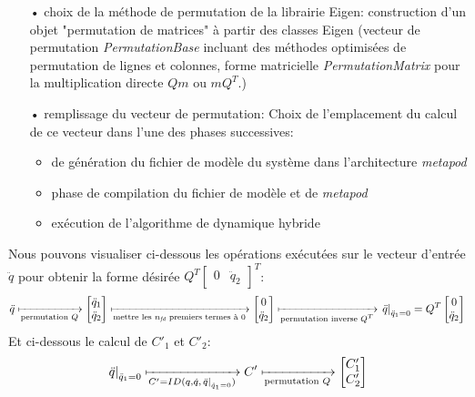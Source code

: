 \documentclass{report}
\begin{document}
\begin{itemize}
  \item[•] choix de la méthode de permutation de la librairie Eigen: construction d'un objet "permutation de matrices" à partir des classes Eigen (vecteur de permutation \emph{PermutationBase} incluant des méthodes optimisées de permutation de lignes et colonnes, forme matricielle \emph{PermutationMatrix} pour la multiplication directe $Qm$ ou $mQ^T$.)
  \item[•] remplissage du vecteur de permutation: Choix de l'emplacement du calcul de ce vecteur dans l'une des phases successives:
  \begin{itemize}
    \item de génération du fichier de modèle du système dans l'architecture \emph{metapod}
    \item phase de compilation du fichier de modèle et de \emph{metapod}
    \item exécution de l'algorithme de dynamique hybride
  \end{itemize}
\end{itemize}
\medskip
Nous pouvons visualiser ci-dessous les opérations exécutées sur le vecteur d'entrée $\ddot{q}$ pour obtenir la forme désirée \(Q^T \begin{bmatrix} 0 & \ddot{q}_2 \end{bmatrix}^T\):
\begin{equation*}
\ddot{q} \xmapsto[\textnormal{permutation $Q$}]{} 
\begin{bmatrix}
  \ddot{q}_1 \\
  \ddot{q}_2
\end{bmatrix}
\xmapsto[\textnormal{mettre les $n_{\emph{fd}}$ premiers termes à 0}]{} 
\begin{bmatrix}
  0 \\
  \ddot{q}_2
\end{bmatrix}
\xmapsto[\textnormal{permutation inverse $Q^T$}]{} 
\left. \ddot{q} \right\vert_{\ddot{q}_1=0} = Q^T
\begin{bmatrix}
  0 \\
  \ddot{q}_2
\end{bmatrix}
\end{equation*}
\medskip
Et ci-dessous le calcul de $C'_1$ et $C'_2$:
\begin{equation*}
\left. \ddot{q} \right\vert_{\ddot{q}_1=0} \xmapsto[C'=ID(q,\dot{q},\left. \ddot{q} \right\vert_{\ddot{q}_1=0})]{} C'
\xmapsto[\textnormal{permutation $Q$}]{} 
\begin{bmatrix}
  C'_1 \\
  C'_2
\end{bmatrix}
\end{equation*}
\end{document}
